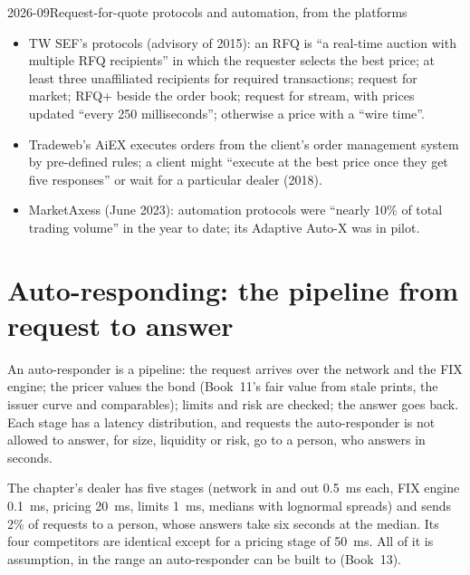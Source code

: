 \begin{dated}{2026-09}{Request-for-quote protocols and automation, from the platforms}\label{dat:nw:fixed-income-and-rfq-platform-connectivity:platforms}
\begin{itemize}
\item TW SEF's protocols (advisory of 2015): an RFQ is ``a real-time auction with multiple RFQ recipients'' in which the
  requester selects the best price; at least three unaffiliated recipients for required transactions; request for market; RFQ+
  beside the order book; request for stream, with prices updated ``every 250 milliseconds''; otherwise a price with a ``wire
  time''.
\item Tradeweb's AiEX executes orders from the client's order management system by pre-defined rules; a client might ``execute at
  the best price once they get five responses'' or wait for a particular dealer (2018).
\item MarketAxess (June 2023): automation protocols were ``nearly 10\% of total trading volume'' in the year to date; its Adaptive
  Auto-X was in pilot.
\end{itemize}
\end{dated}

\section{Auto-responding: the pipeline from request to answer}

An auto-responder is a pipeline: the request arrives over the network and the FIX engine; the pricer values the bond (Book~11's
fair value from stale prints, the issuer curve and comparables); limits and risk are checked; the answer goes back. Each stage
has a latency distribution, and requests the auto-responder is not allowed to answer, for size, liquidity or risk, go to a
person, who answers in seconds.

\label{lst:nw:fixed-income-and-rfq-platform-connectivity:response}

The chapter's dealer has five stages (network in and out \qty{0.5}{\milli\second} each, FIX engine \qty{0.1}{\milli\second},
pricing \qty{20}{\milli\second}, limits \qty{1}{\milli\second}, medians with lognormal spreads) and sends 2\% of requests to a
person, whose answers take six seconds at the median. Its four competitors are identical except for a pricing stage of
\qty{50}{\milli\second}. All of it is assumption, in the range an auto-responder can be built to (Book~13).

